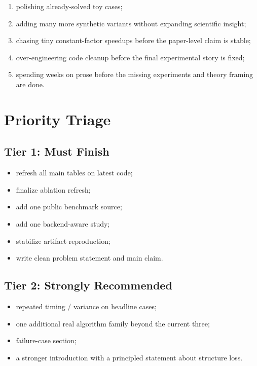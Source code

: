 \documentclass[11pt]{article}
\begin{document}
\begin{enumerate}
    \item polishing already-solved toy cases;
    \item adding many more synthetic variants without expanding scientific insight;
    \item chasing tiny constant-factor speedups before the paper-level claim is stable;
    \item over-engineering code cleanup before the final experimental story is fixed;
    \item spending weeks on prose before the missing experiments and theory framing are done.
\end{enumerate}

\section{Priority Triage}

\subsection{Tier 1: Must Finish}
\begin{itemize}
    \item refresh all main tables on latest code;
    \item finalize ablation refresh;
    \item add one public benchmark source;
    \item add one backend-aware study;
    \item stabilize artifact reproduction;
    \item write clean problem statement and main claim.
\end{itemize}

\subsection{Tier 2: Strongly Recommended}
\begin{itemize}
    \item repeated timing / variance on headline cases;
    \item one additional real algorithm family beyond the current three;
    \item failure-case section;
    \item a stronger introduction with a principled statement about structure loss.
\end{itemize}
\end{document}
